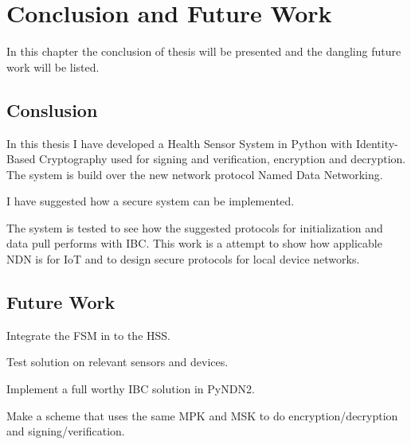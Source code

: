 \chapter{Conclusion and Future Work}\label{chp7:conclusion}
In this chapter the conclusion of thesis will be presented and the dangling future work will be listed.

\section{Conslusion}
In this thesis I have developed a Health Sensor System in Python with Identity-Based Cryptography used for signing and verification, encryption and decryption.
The system is build over the new network protocol Named Data Networking.

I have suggested how a secure system can be implemented.

The system is tested to see how the suggested protocols for initialization and data pull performs with \gls{IBC}. 
This work is a attempt to show how applicable \gls{NDN} is for \gls{IoT} and to design secure protocols for local device networks.

\section{Future Work}
Integrate the \gls{FSM} in to the \gls{HSS}.

Test solution on relevant sensors and devices.

Implement a full worthy \gls{IBC} solution in \gls{PyNDN2}.

Make a scheme that uses the same \gls{MPK} and \gls{MSK} to do encryption/decryption and signing/verification. 
